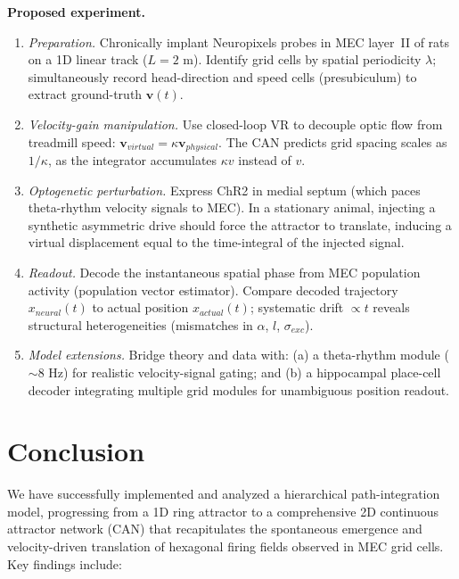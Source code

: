 \documentclass[10pt, a4paper]{article}
\begin{document}
\textbf{Proposed experiment.}

\begin{enumerate}[itemsep=1pt, parsep=0pt, topsep=3pt, partopsep=0pt]
    \item \textit{Preparation.} Chronically implant Neuropixels probes in MEC layer~II of rats on a 1D linear track ($L=2$ m). Identify grid cells by spatial periodicity $\lambda$; simultaneously record head-direction and speed cells (presubiculum) to extract ground-truth $\mathbf{v}(t)$.

    \item \textit{Velocity-gain manipulation.} Use closed-loop VR to decouple optic flow from treadmill speed: $\mathbf{v}_{virtual}=\kappa\mathbf{v}_{physical}$. The CAN predicts grid spacing scales as $1/\kappa$, as the integrator accumulates $\kappa v$ instead of $v$.

    \item \textit{Optogenetic perturbation.} Express ChR2 in medial septum (which paces theta-rhythm velocity signals to MEC). In a stationary animal, injecting a synthetic asymmetric drive should force the attractor to translate, inducing a virtual displacement equal to the time-integral of the injected signal.

    \item \textit{Readout.} Decode the instantaneous spatial phase from MEC population activity (population vector estimator). Compare decoded trajectory $x_{neural}(t)$ to actual position $x_{actual}(t)$; systematic drift $\propto t$ reveals structural heterogeneities (mismatches in $\alpha$, $l$, $\sigma_{exc}$).

    \item \textit{Model extensions.} Bridge theory and data with: (a) a theta-rhythm module ($\sim\!8$ Hz) for realistic velocity-signal gating; and (b) a hippocampal place-cell decoder integrating multiple grid modules for unambiguous position readout.
\end{enumerate}


\section{Conclusion}

We have successfully implemented and analyzed a hierarchical path-integration model, progressing from a 1D ring attractor to a comprehensive 2D continuous attractor network (CAN) that recapitulates the spontaneous emergence and velocity-driven translation of hexagonal firing fields observed in MEC grid cells. Key findings include:
\end{document}
